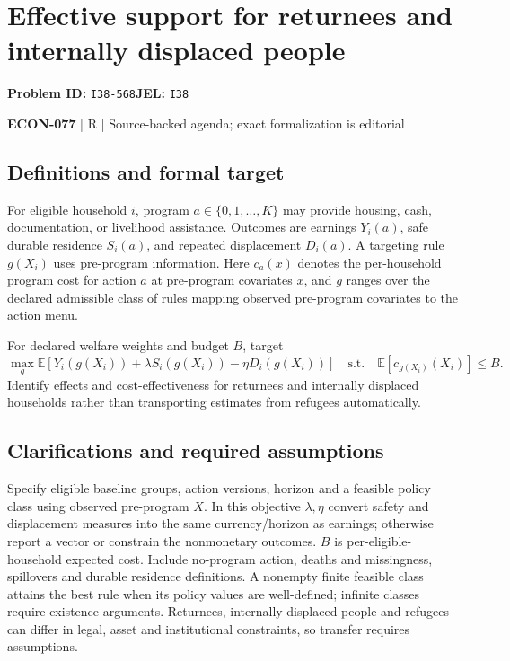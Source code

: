 \documentclass[11pt,a4paper]{article}
\begin{document}
\section*{Effective support for returnees and internally displaced people}
\textbf{Problem ID:} \texttt{I38-568}\quad \textbf{JEL:} \texttt{I38}\par
\label{problem:OP-0643}


\label{audited:ECON-077}

{\sffamily\small\color{muted}\textbf{ECON-077} | R | Source-backed agenda; exact formalization is editorial\par}

\subsection*{Definitions and formal target}

For eligible household $i$, program $a\in\{0,1,\ldots,K\}$ may provide housing, cash, documentation, or livelihood assistance. Outcomes are earnings $Y_i(a)$, safe durable residence $S_i(a)$, and repeated displacement $D_i(a)$. A targeting rule $g(X_i)$ uses pre-program information. Here $c_a(x)$ denotes the per-household program cost for action $a$ at pre-program covariates $x$, and $g$ ranges over the declared admissible class of rules mapping observed pre-program covariates to the action menu.

For declared welfare weights and budget $B$, target
\[
 \max_g\mathbb E[Y_i(g(X_i))+\lambda S_i(g(X_i))-\eta D_i(g(X_i))]
 \quad\text{s.t.}\quad\mathbb E[c_{g(X_i)}(X_i)]\leq B.
\]
Identify effects and cost-effectiveness for returnees and internally displaced households rather than transporting estimates from refugees automatically.

\subsection*{Clarifications and required assumptions}

Specify eligible baseline groups, action versions, horizon and a feasible policy class using observed pre-program \(X\). In this objective \(\lambda,\eta\) convert safety and displacement measures into the same currency/horizon as earnings; otherwise report a vector or constrain the nonmonetary outcomes. \(B\) is per-eligible-household expected cost. Include no-program action, deaths and missingness, spillovers and durable residence definitions. A nonempty finite feasible class attains the best rule when its policy values are well-defined; infinite classes require existence arguments. Returnees, internally displaced people and refugees can differ in legal, asset and institutional constraints, so transfer requires assumptions.
\end{document}
